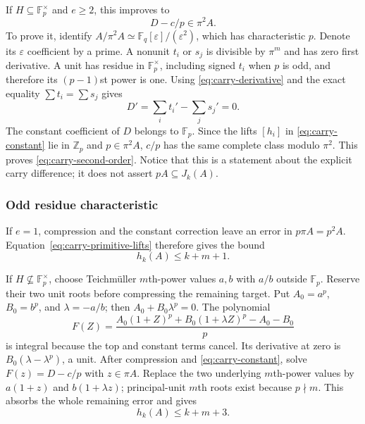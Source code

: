 \documentclass[11pt]{amsart}
\theoremstyle{definition}
\numberwithin{equation}{section}
\begin{document}
If $H\subseteq\mathbb F_p^\times$ and $e\ge2$, this improves to
\begin{equation}\label{eq:carry-second-order}
 D-c/p\in\pi^2A.
\end{equation}
To prove it, identify
$A/\pi^2A\simeq\mathbb F_q[\varepsilon]/(\varepsilon^2)$,
which has characteristic $p$. Denote its $\varepsilon$ coefficient
by a prime. A nonunit $t_i$ or $s_j$ is divisible by $\pi^m$ and
has zero first derivative. A unit has residue in
$\mathbb F_p^\times$, including signed $t_i$ when $p$ is odd, and
therefore its $(p-1)$st power is one. Using
\eqref{eq:carry-derivative} and the exact equality $\sum t_i=\sum s_j$
gives
\[
 D'=\sum_i t_i'-\sum_j s_j'=0.
\]
The constant coefficient of $D$ belongs to $\mathbb F_p$.
Since the lifts $[h_i]$ in \eqref{eq:carry-constant} lie in
$\mathbb Z_p$ and $p\in\pi^2A$, $c/p$ has the same complete class
modulo $\pi^2$. This proves \eqref{eq:carry-second-order}.
Notice that this is a statement about the explicit carry difference;
it does not assert $pA\subseteq J_k(A)$.

\subsubsection{Odd residue characteristic}

If $e=1$, compression and the constant correction leave an error
in $p\pi A=p^2A$. Equation~\eqref{eq:carry-primitive-lifts}
therefore gives the bound
\begin{equation}\label{eq:carry-odd-unramified-count}
 h_k(A)\le k+m+1.
\end{equation}

If $H\nsubseteq\mathbb F_p^\times$, choose Teichm\"uller
$m$th-power values $a,b$ with $a/b$ outside $\mathbb F_p$.
Reserve their two unit roots before compressing the remaining target.
Put $A_0=a^p$, $B_0=b^p$, and $\lambda=-a/b$; then
$A_0+B_0\lambda^p=0$. The polynomial
\[
 F(Z)=\frac{A_0(1+Z)^p+B_0(1+\lambda Z)^p-A_0-B_0}{p}
\]
is integral because the top and constant terms cancel. Its derivative
at zero is $B_0(\lambda-\lambda^p)$, a unit. After compression and
\eqref{eq:carry-constant}, solve $F(z)=D-c/p$ with $z\in\pi A$.
Replace the two underlying $m$th-power values by $a(1+z)$ and
$b(1+\lambda z)$; principal-unit $m$th roots exist because $p\nmid m$.
This absorbs the whole remaining error and gives
\begin{equation}\label{eq:carry-odd-pair-count}
 h_k(A)\le k+m+3.
\end{equation}
\end{document}
